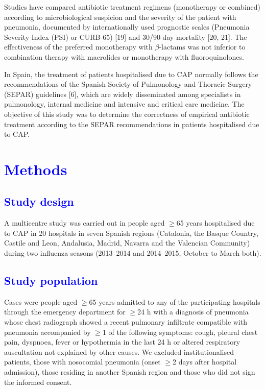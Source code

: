 \documentclass[11pt, a4paper]{article}
\begin{document}
\begin{multicols}{2}
Studies have compared antibiotic treatment regimens (monotherapy or combined) according to microbiological suspicion and the severity of the patient with pneumonia, documented by
internationally used prognostic scales (Pneumonia Severity Index (PSI) or CURB-65) [19] and 30/90-day mortality [20, 21]. The effectiveness of the preferred monotherapy with $\beta$-lactams was not inferior to combination therapy with macrolides or monotherapy with fluoroquinolones.

In Spain, the treatment of patients hospitalised due to CAP normally follows the recommendations of the Spanish Society of Pulmonology and Thoracic Surgery (SEPAR) guidelines [6], which are widely disseminated among specialists in pulmonology, internal medicine and intensive and critical care medicine. The objective of this study was to determine the correctness of empirical antibiotic treatment according to the SEPAR recommendations
in patients hospitalised due to CAP.

\section*{\textcolor{blue}{Methods}}
\subsection*{\textcolor{blue}{Study design}}
A multicentre study was carried out in people aged $\geq$65 years hospitalised due to CAP in 20 hospitals in seven Spanish regions (Catalonia, the Basque Country, Castile and Leon, Andalusia, Madrid, Navarra and the Valencian Community) during two influenza seasons (2013–2014 and 2014–2015, October to March both).

\subsection*{\textcolor{blue}{Study population}}
Cases were people aged $\geq$65 years admitted to any of the participating hospitals through the emergency department for $\geq$24 h with a diagnosis of pneumonia whose chest radiograph showed a recent pulmonary infiltrate compatible with pneumonia accompanied by $\geq$1 of the following symptoms: cough, pleural chest pain, dyspnoea, fever or hypothermia in the last 24 h or altered respiratory auscultation not explained by other causes. We excluded institutionalised patients, those with nosocomial pneumonia (onset $\geq$2 days after hospital admission), those residing in another Spanish region and those who did not sign the
informed consent.


\end{multicols}
\end{document}
